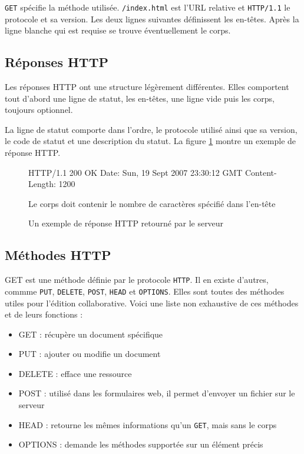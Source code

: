 \documentclass[a4paper, 11pt]{article}
\begin{document}
{		\texttt{GET} spécifie la méthode utilisée. \texttt{/index.html} est l'URL relative et \texttt{HTTP/1.1} le protocole et sa version. Les deux lignes suivantes définissent les en-têtes. Après la ligne blanche qui est requise se trouve éventuellement le corps. 
		
	\subsection{Réponses HTTP}
	
		Les réponses HTTP ont une structure légèrement différentes. Elles comportent tout d'abord une ligne de statut, les en-têtes, une ligne vide puis les corps, toujours optionnel. 
		
		La ligne de statut comporte dans l'ordre, le protocole utilisé ainsi que sa version, le code de statut et une description du statut. La figure \ref{fig:rep_http} montre un exemple de réponse HTTP.
		
		\begin{figure}[ht]
		\begin{center}	
		\begin{boxedverbatim}
			HTTP/1.1 200 OK
			Date: Sun, 19 Sept 2007 23:30:12 GMT
			Content-Length: 1200
						
			Le corps doit contenir le nombre de caractères spécifié dans l'en-tête
		\end{boxedverbatim}
		\caption{Un exemple de réponse HTTP retourné par le serveur}
		\label{fig:rep_http}
		\end{center}
		\end{figure}

	\subsection{Méthodes HTTP}
		
		\textsc{GET} est une méthode définie par le protocole \texttt{HTTP}. Il en existe d'autres, commme  \texttt{PUT}, \texttt{DELETE}, \texttt{POST}, \texttt{HEAD} et \texttt{OPTIONS}. Elles sont toutes des méthodes utiles pour l'édition collaborative. Voici une liste non exhaustive de ces méthodes et de leurs fonctions : 
		
		\begin{itemize}
			\item GET : récupère un document spécifique 
			\item PUT : ajouter ou modifie un document
			\item DELETE : efface une ressource 
			\item POST : utilisé dans les formulaires web, il permet d'envoyer un fichier sur le serveur
			\item HEAD : retourne les mêmes informations qu'un \texttt{GET}, mais sans le corps
			\item OPTIONS : demande les méthodes supportée sur un élément précis
		\end{itemize}
		
}
\end{document}
